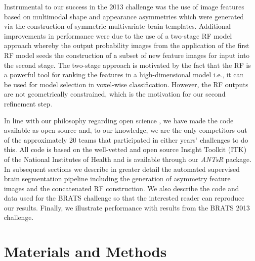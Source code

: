 Instrumental to our success in the 2013 challenge 
was the use of image features based on multimodal shape and appearance 
asymmetries which were generated via the construction of symmetric
multivariate brain templates.  Additional improvements in performance
were due to the use of a two-stage RF model approach
whereby the output probability images from the application of the first
RF model seeds the construction of a subset of new feature images
for input into the second stage.  
The two-stage approach is motivated by
the fact that the RF is a powerful tool for ranking the features
in a high-dimensional model i.e., it can be used for model selection
in voxel-wise classification.  However, the RF outputs are not geometrically 
constrained, which is the motivation for our second refinement step.

In line with our philosophy regarding open science \citep{tustison2013,ince2012}, 
we have made the code available as open source
and, to our knowledge, we are the only competitors out of the approximately 20 teams 
that participated in either years' challenges to do this.  All code is based
on the well-vetted and open source Insight Toolkit (ITK)
of the National Institutes of Health and is available through our \textit{ANTsR} 
package.
In subsequent sections we describe in greater detail the automated 
supervised brain segmentation pipeline including the generation of asymmetry
feature images and the concatenated RF construction.  We also
describe the code and data used for the BRATS challenge so that 
the interested reader can reproduce our results.  Finally, we 
illustrate performance with results from the BRATS 2013 challenge.
 


\section{Materials and Methods}

